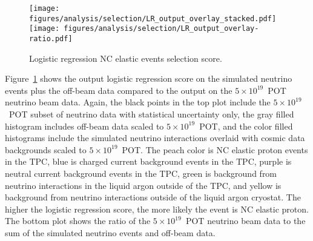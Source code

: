     \begin{figure}[ht]
      \centering
      \texttt{[image: figures/analysis/selection/LR\_output\_overlay\_stacked.pdf]} \\
      \texttt{[image: figures/analysis/selection/LR\_output\_overlay-ratio.pdf]}
      \caption{Logistic regression NC elastic events selection score.}
      \label{fig:lroutput}
    \end{figure}
    Figure~\ref{fig:lroutput} shows the output logistic regression score on the
    simulated neutrino events plus the off-beam data compared to the output on
    the $5\times 10^{19}$~POT neutrino beam data. Again, the black points in
    the top plot include the $5\times 10^{19}$~POT subset of neutrino data with
    statistical uncertainty only, the gray filled histogram includes off-beam
    data scaled to $5\times 10^{19}$~POT, and the color filled histograms
    include the simulated neutrino interactions overlaid with cosmic data
    backgrounds scaled to $5\times 10^{19}$~POT. The peach color is NC elastic
    proton events in the TPC, blue is charged current background events in the
    TPC, purple is neutral current background events in the TPC, green is
    background from neutrino interactions in the liquid argon outside of the
    TPC, and yellow is background from neutrino interactions outside of the
    liquid argon cryostat. The higher the logistic regression score, the more
    likely the event is NC elastic proton. The bottom plot shows the ratio of
    the $5\times 10^{19}$~POT neutrino beam data to the sum of the simulated
    neutrino events and off-beam data.
    
